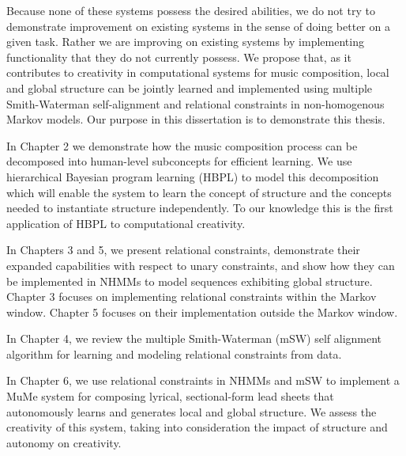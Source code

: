 \documentclass[phd,electronic,oneside,twosidetoc,letterpaper,chaptercenter,parttop,lof,lot]{byumsphd}
\begin{document}
Because none of these systems possess the desired abilities, we do not try to demonstrate improvement on existing systems in the sense of doing better on a given task. Rather we are improving on existing systems by implementing functionality that they do not currently possess. We propose that, as it contributes to creativity in computational systems for music composition, local and global structure can be jointly learned and implemented using multiple Smith-Waterman self-alignment and relational constraints in non-homogenous Markov models. Our purpose in this dissertation is to demonstrate this thesis.

In Chapter 2 we demonstrate how the music composition process can be decomposed into human-level subconcepts for efficient learning. We use hierarchical Bayesian program learning (HBPL) to model this decomposition which will enable the system to learn the concept of structure and the concepts needed to instantiate structure independently. To our knowledge this is the first application of HBPL to computational creativity.

In Chapters 3 and 5, we present relational constraints, demonstrate their expanded capabilities with respect to unary constraints, and show how they can be implemented in NHMMs to model sequences exhibiting global structure. Chapter 3 focuses on implementing relational constraints within the Markov window. Chapter 5 focuses on their implementation outside the Markov window.

In Chapter 4, we review the multiple Smith-Waterman (mSW) self alignment algorithm for learning and modeling relational constraints from data.

In Chapter 6, we use relational constraints in NHMMs and mSW to implement a MuMe system for composing lyrical, sectional-form lead sheets that autonomously learns and generates local and global structure. We assess the creativity of this system, taking into consideration the impact of structure and autonomy on creativity.
\end{document}
